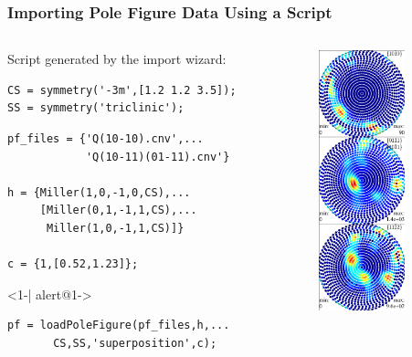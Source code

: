 \begin{frame}[fragile]
  \frametitle{Importing Pole Figure Data Using a Script}

  \begin{columns}
    \begin{column}{8.5cm}

Script generated by the import wizard:

\begin{lstlisting}
CS = symmetry('-3m',[1.2 1.2 3.5]);
SS = symmetry('triclinic');
\end{lstlisting}

\pause

\begin{lstlisting}
pf_files = {'Q(10-10).cnv',...
            'Q(10-11)(01-11).cnv'}

h = {Miller(1,0,-1,0,CS),...
     [Miller(0,1,-1,1,CS),...
      Miller(1,0,-1,1,CS)]}

c = {1,[0.52,1.23]};
\end{lstlisting}

\pause

      \begin{actionenv}<1-| alert@1->
\begin{lstlisting}
pf = loadPoleFigure(pf_files,h,...
       CS,SS,'superposition',c);
\end{lstlisting}
      \end{actionenv}

    \end{column}

    \begin{column}{3cm}
      \includegraphics[width=2.5cm]{pic/pforig}
    \end{column}

  \end{columns}

\end{frame}


